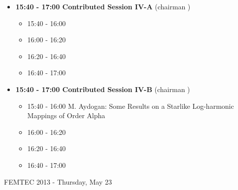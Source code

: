 \documentclass[10pt, A4]{article}%
\begin{document}
\begin{itemize}
  \item {\bf 15:40 - 17:00 Contributed Session IV-A} (chairman ) 
  \begin{itemize}
    \item 15:40 - 16:00
    \item 16:00 - 16:20 
    \item 16:20 - 16:40 
    \item 16:40 - 17:00
  \end{itemize}
  \item {\bf 15:40 - 17:00 Contributed Session IV-B} (chairman ) 
  \begin{itemize}
    \item 15:40 - 16:00 {M. Aydogan}: {Some  Results on a Starlike  Log-harmonic Mappings of Order Alpha}
    \item 16:00 - 16:20 
    \item 16:20 - 16:40 
    \item 16:40 - 17:00
  \end{itemize}  
\end{itemize}

\newpage
\newpage

\centerline{\huge FEMTEC 2013 - Thursday, May 23}
\vspace{4mm}
\end{document}
